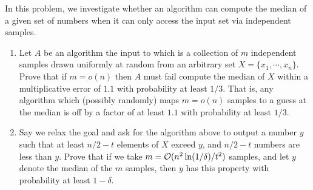 \newpage
\pb
In this problem, we investigate whether an algorithm can compute the median of a given set of numbers when it can only access the input set via independent samples.
\begin{enumerate}[leftmargin=*, label=(\alph*)]
\item Let $A$ be an algorithm the input to which is a collection of $m$ independent samples drawn uniformly at random from an arbitrary set $X = \{x_{1}, \cdots , x_{n}\}$. Prove that if $m = o(n)$ then $A$ must fail compute the median of $X$ within a multiplicative error of $1.1$ with probability at least $1/3$. That is, any algorithm which (possibly randomly) maps $m = o(n)$ samples to a guess at the median is off by a factor of at least $1.1$ with probability at least $1/3$.
\item Say we relax the goal and ask for the algorithm above to output a number $y$ such that at least $n/2 - t$ elements of $X$ exceed $y$, and $n/2 - t$ numbers are less than $y$. Prove that if we take $m = {\mathcal{O}}(n^{2} \ln(1/\delta)/t^{2})$ samples, and let $y$ denote the median of the $m$ samples, then $y$ has this property with probability at least $1-\delta$.
\end{enumerate}

